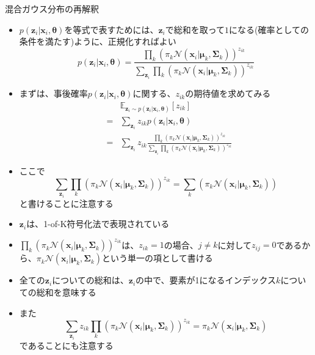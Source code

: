 \documentclass[dvipdfmx,notheorems,t]{beamer}
\begin{document}
\begin{frame}{混合ガウス分布の再解釈}
\begin{itemize}
\begin{itemize}
		\item $p(\bm{z}_i | \bm{x}_i, \bm{\theta})$を等式で表すためには、$\bm{z}_i$で総和を取って$1$になる(確率としての条件を満たす)ように、\alert{正規化すればよい}
		\begin{equation}
			p(\bm{z}_i | \bm{x}_i, \bm{\theta}) = \frac{\displaystyle \prod_k \left( \pi_k \mathcal{N}(\bm{x}_i | \bm{\mu}_k, \bm{\Sigma}_k) \right)^{z_{ik}}}{\displaystyle \sum_{\bm{z}_i} \prod_k \left( \pi_k \mathcal{N}(\bm{x}_i | \bm{\mu}_k, \bm{\Sigma}_k) \right)^{z_{ik}}}
		\end{equation}
		
		\item まずは、事後確率$p(\bm{z}_i | \bm{x}_i, \bm{\theta})$に関する、$z_{ik}$の期待値を求めてみる
		\begin{eqnarray}
			&& \mathbb{E}_{\bm{z}_i \sim p(\bm{z}_i | \bm{x}_i, \bm{\theta})} \left[ z_{ik} \right] \nonumber \\
			&=& \sum_{\bm{z}_i} z_{ik} p(\bm{z}_i | \bm{x}_i, \bm{\theta}) \nonumber \\
			&=& \sum_{\bm{z}_i} z_{ik} \frac{\displaystyle \prod_k \left( \pi_k \mathcal{N}(\bm{x}_i | \bm{\mu}_k, \bm{\Sigma}_k) \right)^{z_{ik}}}{\displaystyle \sum_{\bm{z}_i} \prod_k \left( \pi_k \mathcal{N}(\bm{x}_i | \bm{\mu}_k, \bm{\Sigma}_k) \right)^{z_{ik}}}
		\end{eqnarray}
		
		\item ここで
		\begin{equation}
			\sum_{\bm{z}_i} \prod_k \left( \pi_k \mathcal{N}(\bm{x}_i | \bm{\mu}_k, \bm{\Sigma}_k) \right)^{z_{ik}} = \sum_k \left( \pi_k \mathcal{N}(\bm{x}_i | \bm{\mu}_k, \bm{\Sigma}_k) \right)
		\end{equation}
		と書けることに注意する
		\newline
		
		\item $\bm{z}_i$は、\alert{1-of-K符号化法}で表現されている
		\item $\prod_k \left( \pi_k \mathcal{N}(\bm{x}_i | \bm{\mu}_k, \bm{\Sigma}_k) \right)^{z_{ik}}$は、$z_{ik} = 1$の場合、$j \neq k$に対して$z_{ij} = 0$であるから、$\pi_k \mathcal{N}(\bm{x}_i | \bm{\mu}_k, \bm{\Sigma}_k)$という単一の項として書ける
		\item 全ての$\bm{z}_i$についての総和は、\color{red}$\bm{z}_i$の中で、要素が1になるインデックス$k$についての総和\normalcolor を意味する
		\newline
		
		\item また
		\begin{equation}
			\sum_{\bm{z}_i} z_{ik} \prod_k \left( \pi_k \mathcal{N}(\bm{x}_i | \bm{\mu}_k, \bm{\Sigma}_k) \right)^{z_{ik}} = \pi_k \mathcal{N}(\bm{x}_i | \bm{\mu}_k, \bm{\Sigma}_k)
		\end{equation}
		であることにも注意する
		\newline
		

\end{itemize}
\end{itemize}
\end{frame}
\end{document}
